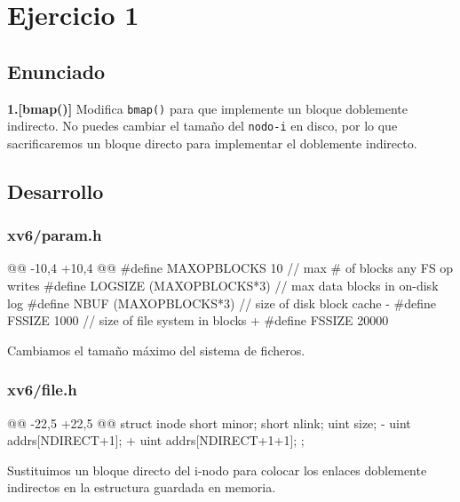 \section{Ejercicio 1}
\subsection{Enunciado}
\begin{ejer}
    \textbf{1.[bmap()]} Modifica \texttt{bmap()} para que implemente un bloque doblemente indirecto. 
    No puedes cambiar el tamaño del \texttt{nodo-i} en disco, por lo que sacrificaremos un bloque directo para 
    implementar el doblemente indirecto.
\end{ejer}

\newpage

\subsection{Desarrollo}
\subsubsection{xv6/param.h}

\begin{listing}
@@ -10,4 +10,4 @@
    #define MAXOPBLOCKS  10  // max # of blocks any FS op writes
    #define LOGSIZE      (MAXOPBLOCKS*3)  // max data blocks in on-disk log
    #define NBUF         (MAXOPBLOCKS*3)  // size of disk block cache
-   #define FSSIZE 1000 // size of file system in blocks
+   #define FSSIZE 20000 
\end{listing}

\par Cambiamos el tamaño máximo del sistema de ficheros.

\subsubsection{xv6/file.h}
\begin{listing}
@@ -22,5 +22,5 @@ struct inode {
    short minor;
    short nlink;
    uint size;
-   uint addrs[NDIRECT+1];
+   uint addrs[NDIRECT+1+1];
  };
\end{listing}

\par Sustituimos un bloque directo del i-nodo para colocar los enlaces
doblemente indirectos en la estructura guardada en memoria.


